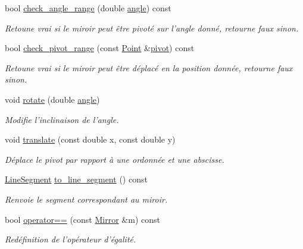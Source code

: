 \begin{DoxyCompactItemize}
bool \hyperlink{classMirror_a0d963145ff485dfb375d75f7f3e5bed5}{check\+\_\+angle\+\_\+range} (double \hyperlink{classMirror_a70b7d41a7df7213da8f8c4ac4c873739}{angle}) const 
\begin{DoxyCompactList}\small\item\em Retoune vrai si le miroir peut être pivoté sur l'angle donné, retourne faux sinon. \end{DoxyCompactList}\item 
bool \hyperlink{classMirror_a06a94bd486bbd4e5ed9856c0d7fb5383}{check\+\_\+pivot\+\_\+range} (const \hyperlink{classPoint}{Point} \&\hyperlink{classMirror_ad68e2946b5267e738663ffdf4b8841f5}{pivot}) const 
\begin{DoxyCompactList}\small\item\em Retoune vrai si le miroir peut être déplacé en la position donnée, retourne faux sinon. \end{DoxyCompactList}\item 
void \hyperlink{classMirror_acd55e5dae638546039a72fc3191c192c}{rotate} (double \hyperlink{classMirror_a70b7d41a7df7213da8f8c4ac4c873739}{angle})
\begin{DoxyCompactList}\small\item\em Modifie l'inclinaison de l'angle. \end{DoxyCompactList}\item 
void \hyperlink{classMirror_a6d2968b4e4baed86fa28c353feeb1a6b}{translate} (const double x, const double y)
\begin{DoxyCompactList}\small\item\em Déplace le pivot par rapport à une ordonnée et une abscisse. \end{DoxyCompactList}\item 
\hyperlink{classLineSegment}{Line\+Segment} \hyperlink{classMirror_a12183555b25eb6768af659a11054beec}{to\+\_\+line\+\_\+segment} () const 
\begin{DoxyCompactList}\small\item\em Renvoie le segment correspondant au miroir. \end{DoxyCompactList}\item 
bool \hyperlink{classMirror_a3a649dee176eabb38fb3ef4b86a94130}{operator==} (const \hyperlink{classMirror}{Mirror} \&m) const 
\begin{DoxyCompactList}\small\item\em Redéfinition de l'opérateur d'égalité. \end{DoxyCompactList}\end{DoxyCompactItemize}

